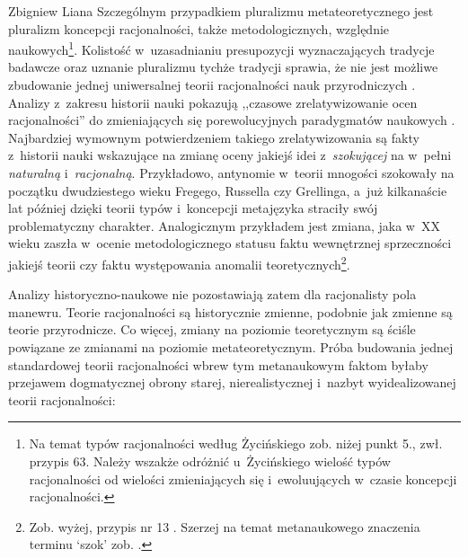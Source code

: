 \begin{artplenv}{Zbigniew Liana}
Szczególnym przypadkiem pluralizmu metateoretycznego jest pluralizm koncepcji racjonalności, także metodologicznych, względnie naukowych\footnote{Na temat typów racjonalności według Życińskiego zob. niżej punkt 5., zwł. przypis 63. Należy wszakże odróżnić u~Życińskiego wielość typów racjonalności od wielości zmieniających się i~ewoluujących w~czasie koncepcji racjonalności.}. Kolistość w~uzasadnianiu presupozycji wyznaczających tradycje badawcze oraz uznanie pluralizmu tychże tradycji sprawia, że nie jest możliwe zbudowanie jednej uniwersalnej teorii racjonalności nauk przyrodniczych
\parencite[][s.~206.226]{zycinski_teizm_1985}. %
 Analizy z~zakresu historii nauki pokazują ,,czasowe zrelatywizowanie ocen racjonalności'' do zmieniających się porewolucyjnych paradygmatów naukowych 
\parencite[][s.~196n]{zycinski_teizm_1985}. %
 Najbardziej wymownym potwierdzeniem takiego zrelatywizowania są fakty z~historii nauki wskazujące na zmianę oceny jakiejś idei z~\textit{szokującej} na w~pełni \textit{naturalną} i~\textit{racjonalną}. Przykładowo, antynomie w~teorii mnogości szokowały na początku dwudziestego wieku Fregego, Russella czy Grellinga, a~już kilkanaście lat później dzięki teorii typów i~koncepcji metajęzyka straciły swój problematyczny charakter. Analogicznym przykładem jest zmiana, jaka w~XX wieku zaszła w~ocenie metodologicznego statusu faktu wewnętrznej sprzeczności jakiejś teorii czy faktu występowania anomalii teoretycznych\footnote{Zob. wyżej, przypis nr 13%
. Szerzej na temat metanaukowego znaczenia terminu ‘szok' zob.
\parencite[][s.~163n.179n]{liana_nauka_2019_liana}.%
}.

Analizy historyczno-naukowe nie pozostawiają zatem dla racjonalisty pola manewru. Teorie racjonalności są historycznie zmienne, podobnie jak zmienne są teorie przyrodnicze. Co więcej, zmiany na poziomie teoretycznym są ściśle powiązane ze zmianami na poziomie metateoretycznym. Próba budowania jednej standardowej teorii racjonalności wbrew tym metanaukowym faktom byłaby przejawem dogmatycznej obrony starej, nierealistycznej i~nazbyt wyidealizowanej teorii racjonalności:




\end{artplenv}
